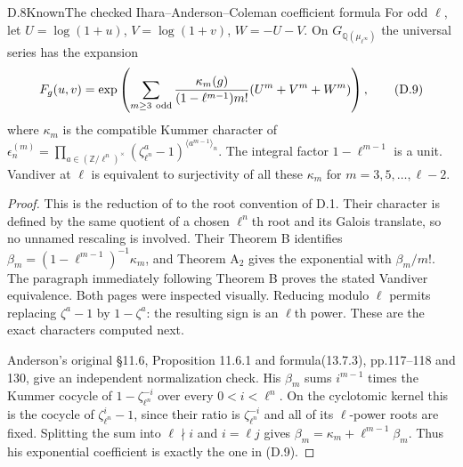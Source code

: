 \begin{statement}{D.8}{Known}{The checked Ihara--Anderson--Coleman coefficient formula}
For odd $\ell$, let $U=\log(1+u)$, $V=\log(1+v)$, $W=-U-V$. On $G_{\mathbb Q(\mu_{\ell^\infty})}$ the universal series has the expansion
\[
 F_g(u,v)=\exp\left(\sum_{m\geq3\ {\rm odd}}
 \frac{\kappa_m(g)}{(1-\ell^{m-1})m!}
 (U^m+V^m+W^m)\right),                                  \tag{D.9}
\]
where $\kappa_m$ is the compatible Kummer character of
$\epsilon_n^{(m)}=\prod_{a\in(\mathbb Z/\ell^n)^\times}(\zeta_{\ell^n}^a-1)^{\langle a^{m-1}\rangle_n}$.
The integral factor $1-\ell^{m-1}$ is a unit. Vandiver at $\ell$ is equivalent to surjectivity of all these $\kappa_m$ for $m=3,5,\ldots,\ell-2$.
\end{statement}
\begin{proof}
This is the reduction of \cite[Theorems A$_2$ and B, equations(9)--(11)]{dIKY1987} to the root convention of D.1. Their character is defined by the same quotient of a chosen $\ell^n$th root and its Galois translate, so no unnamed rescaling is involved. Their Theorem B identifies $\beta_m=(1-\ell^{m-1})^{-1}\kappa_m$, and Theorem A$_2$ gives the exponential with $\beta_m/m!$. The paragraph immediately following Theorem B proves the stated Vandiver equivalence. Both pages were inspected visually. Reducing modulo $\ell$ permits replacing $\zeta^a-1$ by $1-\zeta^a$: the resulting sign is an $\ell$th power. These are the exact characters computed next.

Anderson's original \S11.6, Proposition 11.6.1 and formula(13.7.3),
pp.117--118 and 130, give an independent normalization check.
His $\beta_m$ sums $i^{m-1}$ times the Kummer cocycle of
$1-\zeta_{\ell^n}^{-i}$ over every $0<i<\ell^n$.
On the cyclotomic kernel this is the cocycle of
$\zeta_{\ell^n}^{i}-1$, since their ratio is
$\zeta_{\ell^n}^{-i}$ and all of its $\ell$-power roots are fixed.
Splitting the sum into $\ell\nmid i$ and $i=\ell j$ gives
$\beta_m=\kappa_m+\ell^{m-1}\beta_m$.
Thus his exponential coefficient is exactly the one in (D.9).
\end{proof}

